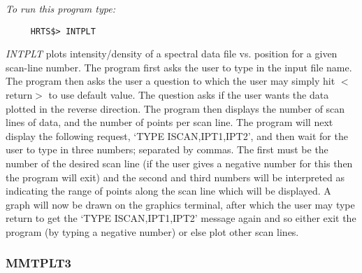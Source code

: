 {\em To run this program type:}
\begin{verbatim}
     HRTS$> INTPLT
\end{verbatim}
  {\em INTPLT} plots intensity/density of a spectral data file vs. position
   for a given scan-line number.  The program first asks the user to type
   in the input file name.  The program then asks the user a question
   to which the user may simply hit $<$return$>$ to use default value.  The
   question asks if the user wants the data plotted in the reverse
   direction. The program then displays the number of scan lines of data, and
the number
   of points per scan line.  The program will next display the following
   request, `TYPE ISCAN,IPT1,IPT2',  and then wait for the user to type in
   three numbers; separated by commas. The first must be the number of the
desired scan line
  (if the user gives a negative number for this then the program will
   exit) and the second and third numbers will be interpreted as
   indicating the range of points along the scan line which will be
   displayed.  A graph will now be drawn on the graphics terminal, after
   which the user may type return to get the `TYPE ISCAN,IPT1,IPT2'
   message again and so either exit the program (by typing a negative
   number) or else plot other scan lines.

\subsubsection{MMTPLT3}

